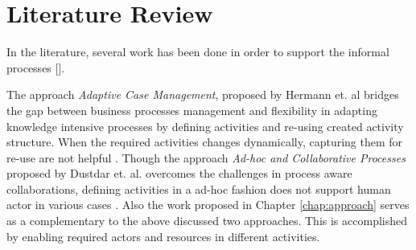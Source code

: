 \section{Literature Review}
\label{sec:literaturereview}
In the literature, several work has been done in order to support the informal processes [].


The approach \textit{Adaptive Case Management}, proposed by Hermann et. al \cite{Herrmann2011} bridges the gap between business processes management and flexibility in adapting knowledge intensive processes by defining activities and re-using created activity structure. When the required activities changes dynamically, capturing them for re-use are not helpful \cite{Sungur2015}. Though the approach \textit{Ad-hoc and Collaborative Processes} proposed by Dustdar et. al. overcomes the challenges in process aware collaborations, defining activities in a ad-hoc fashion does not support human actor in various cases \cite{Sungur2015}. Also the work proposed in Chapter \ref{chap:approach} serves as a complementary to the above discussed two approaches.  This is accomplished by enabling required actors and resources in different activities.   


